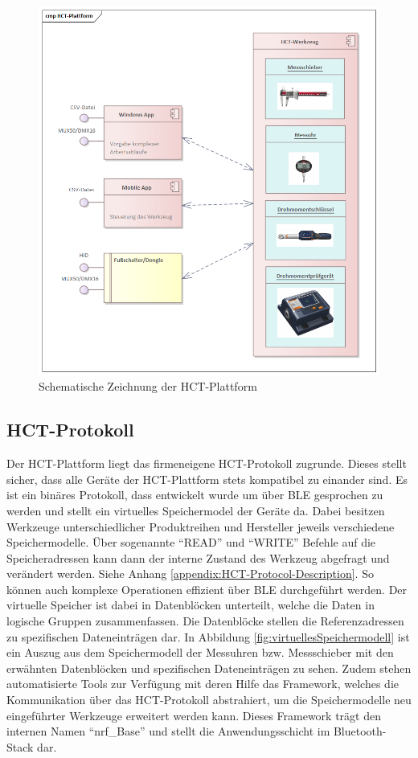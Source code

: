 \begin{figure}[H] 
	\centering
	\includegraphics[width=\textwidth]{figures/HCT-Plattform.png}
	\caption{Schematische Zeichnung der \ac{HCT}-Plattform}
\end{figure}

\subsection{HCT-Protokoll}
Der \ac{HCT}-Plattform liegt das firmeneigene \ac{HCT}-Protokoll zugrunde. Dieses stellt sicher, dass alle Geräte der \ac{HCT}-Plattform stets kompatibel zu einander sind. Es ist ein binäres Protokoll, dass entwickelt wurde um über \ac{BLE} gesprochen zu werden und stellt ein virtuelles Speichermodel der Geräte da. Dabei besitzen Werkzeuge unterschiedlicher Produktreihen und Hersteller jeweils verschiedene Speichermodelle. Über sogenannte ``READ'' und ``WRITE'' Befehle auf die Speicheradressen kann dann der interne Zustand des Werkzeug abgefragt und verändert werden. Siehe Anhang \ref{appendix:HCT-Protocol-Description}. So können auch komplexe Operationen effizient über \ac{BLE} durchgeführt werden. Der virtuelle Speicher ist dabei in Datenblöcken unterteilt, welche die Daten in logische Gruppen zusammenfassen. Die Datenblöcke stellen die Referenzadressen zu spezifischen Dateneinträgen dar. In Abbildung \ref{fig:virtuellesSpeichermodell} ist ein Auszug aus dem Speichermodell der Messuhren bzw. Messschieber mit den erwähnten Datenblöcken und spezifischen Dateneinträgen zu sehen. Zudem stehen automatisierte Tools zur Verfügung mit deren Hilfe das Framework, welches die Kommunikation über das \ac{HCT}-Protokoll abstrahiert, um die Speichermodelle neu eingeführter Werkzeuge erweitert werden kann. Dieses Framework trägt den internen Namen ``nrf\_Base'' und stellt die Anwendungsschicht im Bluetooth-Stack dar.


